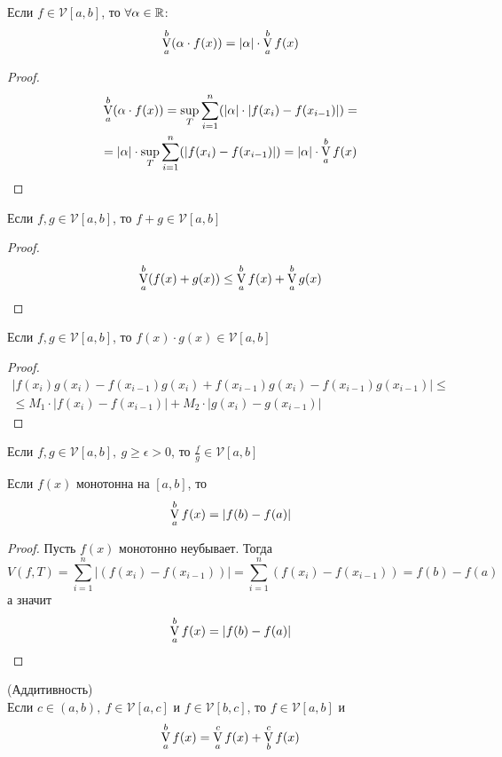 \begin{numtheorem}
    Если $f\in \mathcal{V} [a,b]$, то $\forall \alpha\in \mathbb{R}$:
    \[\operatorname*{V}\limits_{a}^{b}(\alpha\cdot f(x))=|\alpha|\cdot \operatorname*{V}\limits_{a}^{b} f(x)\] 
\end{numtheorem} 
\begin{proof}
    \begin{multline*}
        \operatorname*{V}\limits_{a}^{b}(\alpha\cdot f(x))=\sup\limits_T \sum\limits_{i=1}^{n}(|\alpha|\cdot|f(x_i)-f(x_{i-1})|)=\\
        =|\alpha|\cdot \sup\limits_T \sum\limits_{i=1}^{n}(|f(x_i)-f(x_{i-1})|)=|\alpha|\cdot \operatorname*{V}\limits_{a}^{b}f(x)
    \end{multline*} 
\end{proof} 
\begin{numtheorem}
    Если $f,g\in \mathcal{V}[a,b]$, то $f+g\in \mathcal{V}[a,b]$
\end{numtheorem} 
\begin{proof}
    \[\operatorname*{V}\limits_{a}^{b} (f(x)+g(x))\leq \operatorname*{V}\limits_{a}^{b} f(x)+\operatorname*{V}\limits_{a}^{b} g(x)\]
\end{proof} 
\begin{numtheorem}
    Если $f,g\in \mathcal{V}[a,b]$, то $f(x)\cdot g(x)\in \mathcal{V}[a,b]$
\end{numtheorem} 
\begin{proof}
    \begin{multline*}
        |f(x_i)g(x_i)-f(x_{i-1})g(x_i)+f(x_{i-1})g(x_{i})-f(x_{i-1})g(x_{i-1})|\leq\\
        \leq M_1\cdot |f(x_i)-f(x_{i-1})|+M_2\cdot |g(x_i)-g(x_{i-1})|
    \end{multline*}
\end{proof} 
\begin{numtheorem}
    Если $f,g\in \mathcal{V}[a,b],\ g\geq \epsilon>0$, то $\frac{f}{g}\in \mathcal{V}[a,b]$
\end{numtheorem} 
\begin{numtheorem}
    Если $f(x)$ монотонна на $[a,b]$, то
    \[\operatorname*{V}\limits_{a}^{b} f(x)=|f(b)- f(a)|\]
\end{numtheorem}
\begin{proof}
    Пусть $f(x)$ монотонно неубывает. Тогда
    \[V(f,T)=\sum\limits_{i=1}^{n}|(f(x_i)-f(x_{i-1}))|=\sum\limits_{i=1}^{n}(f(x_i)-f(x_{i-1}))=f(b)-f(a)\]
    а значит
    \[\operatorname*{V}\limits_{a}^{b}f(x)=|f(b)-f(a)|\]
\end{proof} 
\begin{numtheorem} (Аддитивность)\\
    Если $c\in (a,b),\ f\in \mathcal{V}[a,c]$ и $f\in \mathcal{V}[b,c]$, то $f\in \mathcal{V}[a,b]$ и 
    \[\operatorname*{V}\limits_{a}^{b}f(x)=\operatorname*{V}\limits_{a}^{c}f(x)+\operatorname*{V}\limits_{b}^{c}f(x)\]
\end{numtheorem} 
